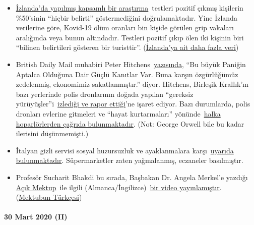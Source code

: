 \begin{itemize}
\item
  \href{https://www.government.is/news/article/?newsid=c65cf658-6eb6-11ea-9462-005056bc4d74}{İzlanda'da
  yapılmış kapsamlı bir araştırma}~testleri pozitif çıkmış kişilerin
  \%50'sinin ``hiçbir belirti'' göstermediğini doğrulamaktadır. Yine
  İzlanda verilerine göre, Kovid-19 ölüm oranları bin kişide görülen
  grip vakaları aralığında veya bunun altındadır. Testleri pozitif çıkıp
  ölen iki kişinin biri ``bilinen belirtileri gösteren bir turisttir''.
  (\href{https://www.covid.is/data}{İzlanda'ya ait daha fazla veri})
\item
  British Daily Mail muhabiri Peter
  Hitchens~\href{https://hitchensblog.mailonsunday.co.uk/2020/03/theres-powerful-evidence-this-great-panic-is-foolish-yet-our-freedom-is-still-broken-and-our-economy.html}{yazısında},
  ``Bu büyük Paniğin Aptalca Olduğuna Dair Güçlü Kanıtlar Var. Buna
  karşın özgürlüğümüz zedelenmiş, ekonomimiz sakatlanmıştır.'' diyor.
  Hitchens, Birleşik Krallık'ın bazı yerlerinde polis dronlarının doğada
  yapılan ``gereksiz
  yürüyüşler''i~\href{https://www.youtube.com/watch?v=fHNxDzLsPeg}{izlediği
  ve rapor ettiği}'ne işaret ediyor. Bazı durumlarda, polis dronları
  evlerine gitmeleri ve ``hayat kurtarmaları''
  yönünde~\href{https://www.youtube.com/watch?v=D4GEZjUTkqc}{halka
  hoparlörlerden çağrıda bulunmaktadır}. (Not: George Orwell bile bu
  kadar ilerisini düşünmemişti.)
\item
  İtalyan gizli servisi sosyal huzursuzluk ve ayaklanmalara
  karşı~\href{https://www.focus.de/panorama/welt/sorge-vor-sozialen-unruhen-supermaerkte-gepluendert-apotheken-ueberfallen-italiens-geheimdienst-warnt-vor-aufstaenden_id_11826664.html}{uyarıda
  bulunmaktadır}. Süpermarketler zaten yağmalanmış, eczaneler
  basılmıştır.
\item
  Profesör Sucharit Bhakdi bu sırada, Başbakan Dr. Angela Merkel'e
  yazdığı
  \href{https://swprs.org/open-letter-from-professor-sucharit-bhakdi-to-german-chancellor-dr-angela-merkel/}{Açık
  Mektup}~ile ilgili
  (Almanca/İngilizce)~\href{https://www.youtube.com/watch?v=LsExPrHCHbw\&feature=emb_title}{bir
  video yayınlamıştır}.
  (\href{https://www.coronagercegi.com/post/prof-dr-sucharit-bhakdi-den-merkel-e-a\%C3\%A7\%C4\%B1k-mektup}{Mektubun
  Türkçesi})
\end{itemize}

\hypertarget{30-mart-2020-ii}{%
\paragraph{30 Mart 2020 (II)}\label{30-mart-2020-ii}}

